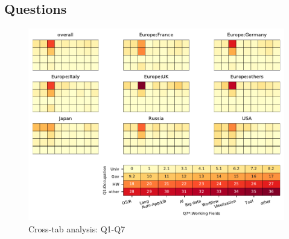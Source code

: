 
\subsection{Questions}


\begin{figure}
\begin{center}
\includegraphics[width=12cm]{../pdfs/Q1-Q7.pdf}
\caption{Cross-tab analysis: Q1-Q7}
\label{fig:Q1-Q7}
\end{center}
\end{figure}
